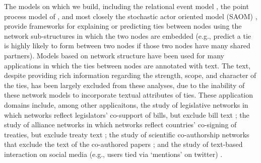 \documentclass{article}
\begin{document}
The models on which we build, including the relational event model \citep{Butts2008}, the point process model of \citet{PerryWolfe2012}, and most closely the stochastic actor oriented model (SAOM) \citep{snijders1996stochastic}, provide frameworks for explaining or predicting ties between nodes using the network sub-structures in which the two nodes are embedded (e.g., predict a tie is highly likely to form between two nodes if those two nodes have many shared partners). Models based on network structure have been used for many applications in which the ties between nodes are annotated with text. The text, despite providing rich information regarding the strength, scope, and character of the ties, has been largely excluded from these analyses, due to the inability of these network models to incorporate textual attributes of ties. These application domains include, among other applicaitons, the study of legislative networks in which networks reflect legislators' co-support of bills, but exclude bill text \cite{bratton2011networks,aleman2013explaining}; the study of alliance networks in which networks reflect countries' co-signing of treaties, but exclude treaty text \cite{camber2010geometry,cranmer2012complex,cranmer2012toward,kinne2016agreeing}; the study of scientific co-authorship networks that exclude the text of the co-authored papers \cite{kronegger2011collaboration,liang2015changing,fahmy2016gender}; and the study of text-based interaction on social media (e.g., users tied via `mentions' on twitter) \cite{yoon2014strategies,peng2016follower,lai2017connecting}.
\end{document}
